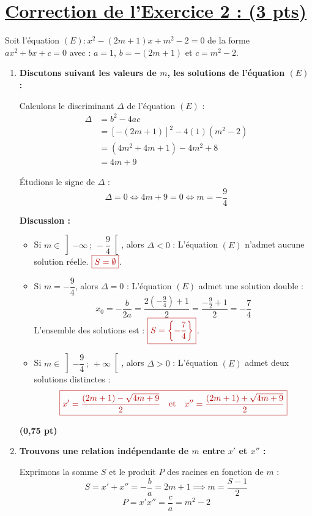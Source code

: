 \documentclass[12pt,a4paper]{article}
\newcommand{\redtitle}[1]{\textcolor{myred}{\textbf{#1}}}
\newcommand{\redbox}[1]{\color{myred}\boxed{#1}\color{black}}
\begin{document}
\section*{\underline{\redtitle{Correction de l'Exercice 2 : (3 pts)}}}

Soit l'équation $(E) : x^2 - (2m + 1)x + m^2 - 2 = 0$ de la forme $ax^2 + bx + c = 0$ avec :
$a = 1$, $b = -(2m + 1)$ et $c = m^2 - 2$.

\begin{enumerate}
    \item \redtitle{Discutons suivant les valeurs de $m$, les solutions de l'équation $(E)$ :}
    
    Calculons le discriminant $\Delta$ de l'équation $(E)$ :
    \begin{align*}
        \Delta &= b^2 - 4ac \\
               &= [-(2m + 1)]^2 - 4(1)(m^2 - 2) \\
               &= (4m^2 + 4m + 1) - 4m^2 + 8 \\
               &= 4m + 9
    \end{align*}
    
    Étudions le signe de $\Delta$ :
    \[ \Delta = 0 \iff 4m + 9 = 0 \iff m = -\dfrac{9}{4} \]
    
    \textbf{Discussion :}
    \begin{itemize}
        \item Si $m \in \left]-\infty \,;~ -\dfrac{9}{4}\right[$, alors $\Delta < 0$ : L'équation $(E)$ n'admet aucune solution réelle. $\redbox{S = \emptyset}$.
        \item Si $m = -\dfrac{9}{4}$, alors $\Delta = 0$ : L'équation $(E)$ admet une solution double :
        \[ x_0 = -\dfrac{b}{2a} = \dfrac{2\left(-\frac{9}{4}\right) + 1}{2} = \dfrac{-\frac{9}{2} + 1}{2} = -\dfrac{7}{4} \]
        L'ensemble des solutions est : $\redbox{S = \left\{-\dfrac{7}{4}\right\}}$.
        \item Si $m \in \left]-\dfrac{9}{4} \,;~ +\infty\right[$, alors $\Delta > 0$ : L'équation $(E)$ admet deux solutions distinctes :
        \[ \redbox{x' = \dfrac{(2m+1) - \sqrt{4m+9}}{2} \quad \text{et} \quad x'' = \dfrac{(2m+1) + \sqrt{4m+9}}{2}} \]
    \end{itemize} \hfill \textbf{(0,75 pt)}
    
    \item \redtitle{Trouvons une relation indépendante de $m$ entre $x'$ et $x''$ :}
    
    Exprimons la somme $S$ et le produit $P$ des racines en fonction de $m$ :
    \[ S = x' + x'' = -\dfrac{b}{a} = 2m + 1 \implies m = \dfrac{S - 1}{2} \]
    \[ P = x'x'' = \dfrac{c}{a} = m^2 - 2 \]
    

\end{enumerate}
\end{document}
